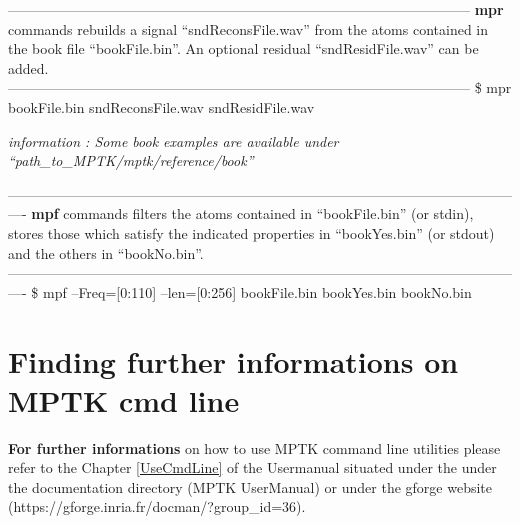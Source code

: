 \vspace{0.2 cm}

\noindent \textcolor[rgb]{0.4,0.4,0.4}{---------------------------------------------------------------------------------------------------\newline
\textbf{mpr} commands rebuilds a signal ``sndReconsFile.wav'' from the atoms contained in 
the book file ``bookFile.bin''. An optional residual ``sndResidFile.wav'' can be added.\newline                   
---------------------------------------------------------------------------------------------------\newline}
\$ mpr bookFile.bin sndReconsFile.wav sndResidFile.wav

\vspace{0.2 cm}

\noindent \emph{information : Some book examples are available under ``path\_to\_MPTK/mptk/reference/book''}

\vspace{0.1 cm}

\noindent \textcolor[rgb]{0.4,0.4,0.4}{----------------------------------------------------------------------------------------------------------------\newline
\textbf{mpf} commands filters the atoms contained in ``bookFile.bin'' (or stdin), stores those which 
satisfy the indicated properties in ``bookYes.bin'' (or stdout) and the others in ``bookNo.bin''.\newline
----------------------------------------------------------------------------------------------------------------\newline}
\$ mpf --Freq=[0:110] --len=[0:256] bookFile.bin bookYes.bin bookNo.bin

\section{Finding further informations on MPTK cmd line}

\textbf{For further informations} on how to use MPTK command line utilities please refer to the 
Chapter \ref{UseCmdLine} of the Usermanual situated under the  under the documentation directory 
(MPTK UserManual) or under the gforge website (https://gforge.inria.fr/docman/?group\_id=36).